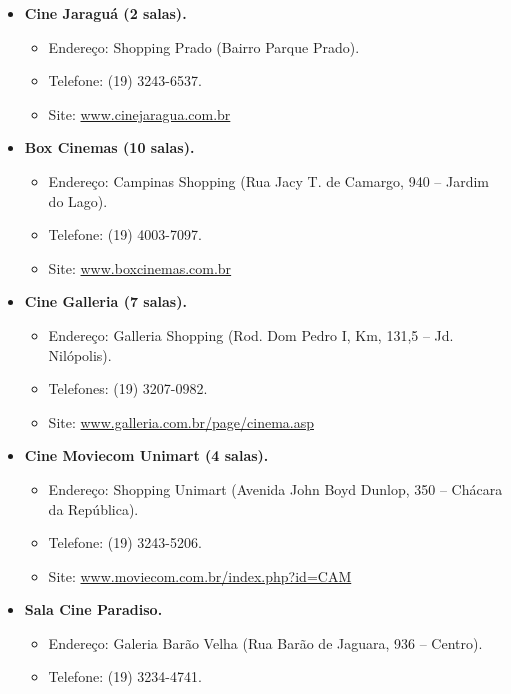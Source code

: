 \begin{itemize}
\item  \textbf{Cine Jaraguá (2 salas).}
\begin{itemize}
\item  Endereço: Shopping Prado (Bairro Parque Prado).
\item  Telefone: (19) 3243-6537.
\item  Site: \url{www.cinejaragua.com.br}
\end{itemize}
\end{itemize}

\begin{itemize}
\item  \textbf{Box Cinemas (10 salas).}
\begin{itemize}
\item  Endereço: Campinas Shopping (Rua Jacy T. de Camargo, 940 -- Jardim do Lago).
\item  Telefone: (19) 4003-7097.
\item  Site: \url{www.boxcinemas.com.br}
\end{itemize}
\end{itemize}

\begin{itemize}
\item  \textbf{Cine Galleria (7 salas).}
\begin{itemize}
\item  Endereço: Galleria Shopping (Rod. Dom Pedro I, Km, 131,5 -- Jd. Nilópolis).
\item  Telefones: (19) 3207-0982.
\item  Site: \url{www.galleria.com.br/page/cinema.asp}
\end{itemize}
\end{itemize}

\begin{itemize}
\item  \textbf{Cine Moviecom Unimart (4 salas).}
\begin{itemize}
\item  Endereço: Shopping Unimart (Avenida John Boyd Dunlop, 350 -- Chácara da República).
\item  Telefone: (19) 3243-5206.
\item  Site: \url{www.moviecom.com.br/index.php?id=CAM}
\end{itemize}
\end{itemize}

\begin{itemize}
\item  \textbf{Sala Cine Paradiso.}
\begin{itemize}
\item  Endereço: Galeria Barão Velha (Rua Barão de Jaguara, 936 -- Centro).
\item  Telefone: (19) 3234-4741.
\end{itemize}
\end{itemize}

